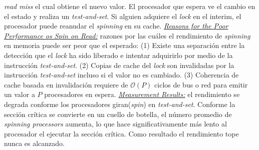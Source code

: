 \textit{read miss} el cual obtiene el nuevo valor. El procesador que espera ve el cambio en el estado y realiza un \textit{test-and-set}. Si alguien adquiere el \textit{lock} en el interim, el procesador puede reanudar el \textit{spinning} en su cache. \underline{\textit{Reasons for the Poor Performance os Spin on Read:}} razones por las cuáles el rendimiento de \textit{spinning} en memoria puede ser peor que el esperado: (1) Existe una separación entre la detección que el \textit{lock} ha sido liberado e intentar adquirirlo por medio de la instrucción \textit{test-and-set}. (2) Copias de cache del \textit{lock} son invalidadas por la instrucción \textit{test-and-set} incluso si el valor no es cambiado. (3) Coherencia de cache basada en invalidación requiere de $\mathcal{O}(P)$ ciclos de bus o red para emitir un valor a $P$ procesadores en espera. \underline{\textit{Measurement Results:}} el rendimiento se degrada conforme los procesadores giran(\textit{spin}) en \textit{test-and-set}. Conforme la sección crítica se convierte en un cuello de botella, el número promedio de \textit{spinning processors} aumenta, lo que hace significativamente más lento al procesador el ejecutar la sección crítica. Como resultado el rendimiento tope nunca es alcanzado.

